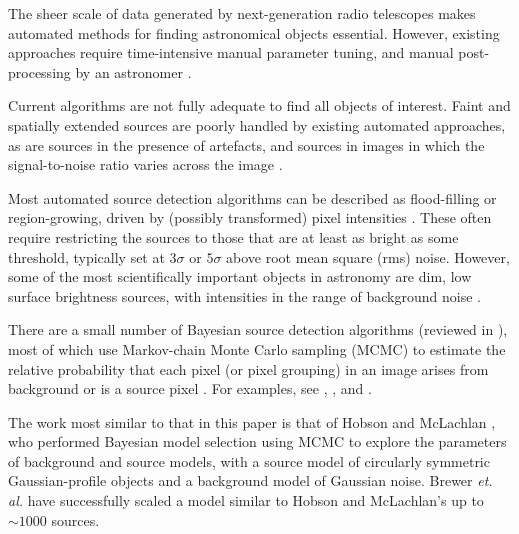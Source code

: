 \documentclass[
    ,final            %
  ]
  {aipproc}
\begin{document}
\maketitle


The sheer scale of data generated by next-generation radio telescopes makes automated methods for finding astronomical objects essential. However, existing approaches require time-intensive manual parameter tuning, and manual post-processing by an astronomer \cite{norris2011emu}.

Current algorithms are not fully adequate to find all objects of interest. Faint and spatially extended sources are poorly handled by existing automated approaches, as are sources in the presence of artefacts, and sources in images in which the signal-to-noise ratio varies across the image \cite{hollitt2012feature, norris2011emu, norris2012radio}.

Most automated source detection algorithms can be described
as flood-filling or region-growing, driven by (possibly transformed)
pixel intensities \cite{masias2012review}.  These often require 
restricting the sources to those that are at least as bright as some
threshold, typically set at $3 \sigma$ or $5 \sigma$ above root mean
square (rms) noise. However, some of the most scientifically important
objects in astronomy are dim, low surface brightness sources, with
intensities in the range of background noise \cite{norris2011emu}.

There are a small number of Bayesian source detection algorithms (reviewed in \cite{masias2012review}), most of which use Markov-chain Monte Carlo sampling (MCMC) to estimate the relative probability that each pixel (or pixel grouping) in an image arises from background or is a source pixel \cite{feroz2008multimodal, masias2012review}. For examples, see \cite{savage2007bayesian}, \cite {carvalho2009fast}, and \cite{guglielmetti2009background}.  

The work most similar to that in this paper is that of Hobson and McLachlan \cite{hobson2003bayesian}, who performed Bayesian model selection using MCMC to explore the parameters of background and source models, with a source model of circularly symmetric Gaussian-profile objects and a background model of Gaussian noise. 
Brewer \textit{et. al.} \cite{brewer2013probabilistic} have successfully scaled a model similar to Hobson and McLachlan's \cite{hobson2003bayesian} up to $\sim 1000$ sources.
\end{document}
